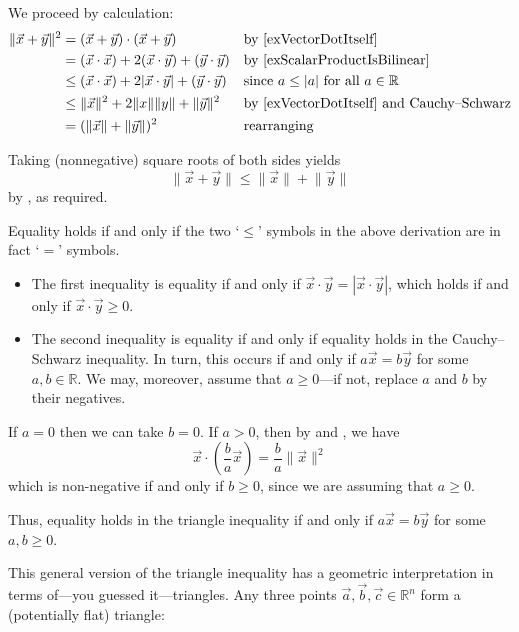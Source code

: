 \begin{cproof}
We proceed by calculation:
\begin{align*}
\lVert \vec x + \vec y \rVert^2
&= (\vec x + \vec y) \cdot (\vec x + \vec y) && \text{by \Cref{exVectorDotItself}} \\
&= (\vec x \cdot \vec x) + 2(\vec x \cdot \vec y) + (\vec y \cdot \vec y) && \text{by \Cref{exScalarProductIsBilinear}} \\
&\le (\vec x \cdot \vec x) + 2|\vec x \cdot \vec y| + (\vec y \cdot \vec y) && \text{since $a \le |a|$ for all $a \in \mathbb{R}$} \\
&\le \lVert \vec x \rVert^2 + 2\lVert x \rVert \lVert y \rVert + \lVert \vec y \rVert^2 && \text{by \Cref{exVectorDotItself} and Cauchy--Schwarz} \\
&= (\lVert \vec x \rVert + \lVert \vec y \rVert)^2 && \text{rearranging}
\end{align*}

Taking (nonnegative) square roots of both sides yields
\[ \lVert \vec x + \vec y \rVert \le \lVert \vec x \rVert + \lVert \vec y \rVert \]
by , as required.

Equality holds if and only if the two `$\le$' symbols in the above derivation are in fact `$=$' symbols.
\begin{itemize}
\item The first inequality is equality if and only if $\vec x \cdot \vec y = |\vec x \cdot \vec y|$, which holds if and only if $\vec x \cdot \vec y \ge 0$.
\item The second inequality is equality if and only if equality holds in the Cauchy--Schwarz inequality. In turn, this occurs if and only if $a\vec x = b \vec y$ for some $a,b \in \mathbb{R}$. We may, moreover, assume that $a \ge 0$---if not, replace $a$ and $b$ by their negatives.
\end{itemize}
If $a=0$ then we can take $b=0$.
If $a>0$, then by  and , we have
\[ \vec x \cdot \left( \frac{b}{a} \vec x \right) = \frac{b}{a} \lVert \vec x \rVert^2 \]
which is non-negative if and only if $b \ge 0$, since we are assuming that $a \ge 0$.

Thus, equality holds in the triangle inequality if and only if $a\vec x = b\vec y$ for some $a,b \ge 0$.
\end{cproof}

This general version of the triangle inequality has a geometric interpretation in terms of---you guessed it---triangles. Any three points $\vec a, \vec b, \vec c \in \mathbb{R}^n$ form a (potentially flat) triangle:

